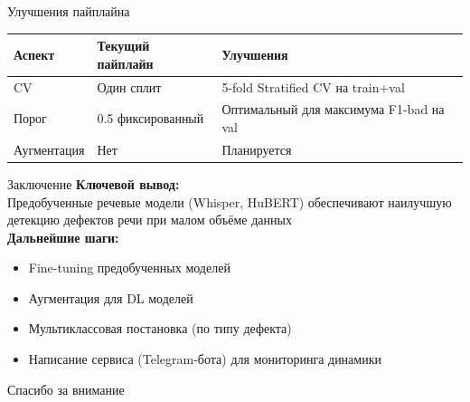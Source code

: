 \documentclass[aspectratio=169]{beamer}
\begin{document}
\begin{frame}{Улучшения пайплайна}
  \footnotesize
  \setlength{\tabcolsep}{5pt}
  \begin{tabular}{p{}p{}p{}}
    \toprule
    \textbf{Аспект} & \textbf{Текущий пайплайн} & \textbf{Улучшения} \\
    \midrule
    CV & Один сплит & 5-fold Stratified CV на train+val \\[0.4em]
    Порог & 0.5 фиксированный & Оптимальный для максимума F1-bad на val\\[0.4em]
    Аугментация & Нет & Планируется \\[0.4em]
    \bottomrule
  \end{tabular}
\end{frame}

\begin{frame}{Заключение}
  \textbf{Ключевой вывод:}\\
  Предобученные речевые модели (Whisper, HuBERT) обеспечивают наилучшую детекцию дефектов речи при малом объёме данных \\[1em]

  \textbf{Дальнейшие шаги:}
  \begin{itemize}
    \item Fine-tuning предобученных моделей
    \item Аугментация для DL моделей
    \item Мультиклассовая постановка (по типу дефекта)
    \item Написание сервиса (Telegram-бота) для мониторинга динамики
  \end{itemize}
\end{frame}

\begin{frame}
  \vfill
  \centering
  {\LARGE Спасибо за внимание}
  \vfill
\end{frame}
\end{document}
